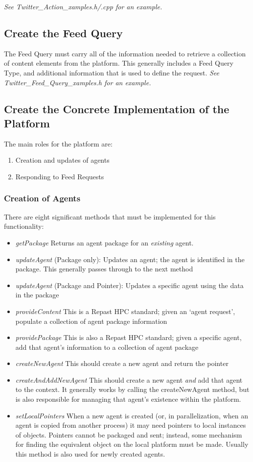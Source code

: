 \textit{See Twitter\_Action\_xamples.h/.cpp for an example.}

\subsection{Create the Feed Query}
The Feed Query must carry all of the information needed to retrieve a collection of content elements from  the platform. This generally includes a Feed Query Type, and additional information that is used to define the request. \textit{See Twitter\_Feed\_Query\_xamples.h for an example.}

\subsection{Create the Concrete Implementation of the Platform}
The main roles for the platform are:

\begin{enumerate}
\item Creation and updates of agents
\item Responding to Feed Requests
\end{enumerate}

\subsubsection{Creation of Agents}
There are eight significant methods that must be implemented for this functionality: 

\begin{itemize}
\item \textit{getPackage} Returns an agent package for an \textit{existing} agent.
\item \textit{updateAgent} (Package only): Updates an agent; the agent is identified in the package. This generally passes through to the next method
\item \textit{updateAgent} (Package and Pointer): Updates a specific agent using the data in the package
\item \textit{provideContent} This is a Repast HPC standard; given an `agent request', populate a collection of agent package information
\item \textit{providePackage} This is also a Repast HPC standard; given a specific agent, add that agent's information to a collection of agent package
\item \textit{createNewAgent} This should create a new agent and return the pointer
\item \textit{createAndAddNewAgent} This should create a new agent \textit{and} add that agent to the context. It generally works by calling the createNewAgent method, but is also responsible for managing that agent's existence within the platform.
\item \textit{setLocalPointers} When a new agent is created (or, in parallelization, when an agent is copied from another process) it may need pointers to local instances of objects. Pointers cannot be packaged and sent; instead, some mechanism for finding the equivalent object on the local platform must be made. Usually this method is also used for newly created agents.
\end{itemize}

